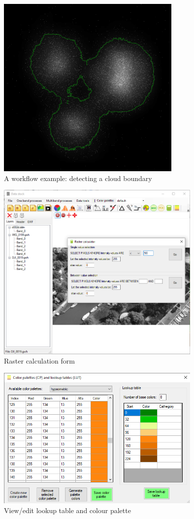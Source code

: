 \documentclass[a4paper,12pt]{article}
\begin{document}
	\begin{figure}
	\centering
	\includegraphics[width=9cm]{cloud.png}
	\caption{A workflow example: detecting a cloud boundary}
	\label{fig:cloud}
	\end{figure}

	\begin{figure}
	\centering
	\includegraphics[width=10cm]{rastcalc.png}
	\caption{Raster calculation form}
	\label{fig:rastcalc}
	\end{figure}

	\begin{figure}
	\centering
	\includegraphics[width=10cm]{lut.png}
	\caption{View/edit lookup table and colour palette}
	\label{fig:lut}
	\end{figure}
\end{document}
